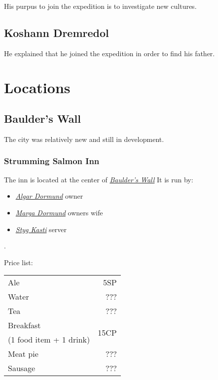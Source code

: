 \documentclass{article}
\begin{document}
\begin{multicols}{2}
    His purpus to join the expedition is to investigate new cultures.

    \subsection{Koshann Dremredol}
    \label{koshann}

    He explained that he joined the expedition in order to find his father.

    \section{Locations}
    \label{locations}

    \subsection{Baulder's Wall}
    \label{baulders_wall}

    The city was relatively new and still in development.

    \subsubsection{Strumming Salmon Inn}
    \label{strumming_salmon}

    The inn is located at the center of \hyperref[baulders_wall]{\textit{Baulder's Wall}} It is run by:

    \begin{itemize}
        \item \hyperref[algar]{\textit{Algar Dormund}} owner
        \item \hyperref[marga]{\textit{Marga Dormund}} owners wife
        \item \hyperref[styg]{\textit{Styg Kasti}} server
    \end{itemize}.

    Price list:

    \begin{tabular}{l r}
        Ale                   & \multirow{1}{1cm}{5SP}  \\
        Water                 & \multirow{1}{1cm}{???}  \\
        Tea                   & \multirow{1}{1cm}{???}  \\
        Breakfast             & \multirow{2}{1cm}{15CP} \\
        (1 food item + 1 drink)                         \\
        Meat pie              & \multirow{1}{1cm}{???}  \\
        Sausage \and potatoes & \multirow{1}{1cm}{???}  \\
    \end{tabular}


\end{multicols}
\end{document}
